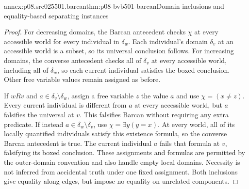 \begin{annexitem}{annex:p08.src025501.barcan}{thm:p08-bvb501-barcan}{Domain inclusions and equality-based separating instances}
\begin{proof}
For decreasing domains, the Barcan antecedent checks \(\chi\)
at every accessible world for every individual in \(\delta_w\).
Each individual's domain \(\delta_v\) at an accessible world
is a subset, so its universal conclusion follows. For increasing
domains, the converse antecedent checks all of \(\delta_v\)
at every accessible world, including all of \(\delta_w\),
so each current individual satisfies the boxed conclusion. Other free
variable values remain assigned as before.

If \(wRv\) and \(a\in\delta_v\setminus\delta_w\), assign
a free variable \(z\) the value \(a\) and use \(\chi=(x\ne z)\).
Every current individual is different from \(a\) at every accessible
world, but \(a\) falsifies the universal at \(v\). This falsifies
Barcan without requiring any extra predicate. If instead
\(a\in\delta_w\setminus\delta_v\), use
\(\chi=\exists y(y=x)\). At every world, all of its locally
quantified individuals satisfy this existence formula, so the converse
Barcan antecedent is true. The current individual \(a\) fails
that formula at \(v\), falsifying its boxed conclusion.
These assignments and formulas are permitted by the outer-domain
convention and also handle empty local domains. Necessity is not
inferred from accidental truth under one fixed assignment. Both
inclusions give equality along edges, but impose no equality on
unrelated components.
\end{proof}
\end{annexitem}

